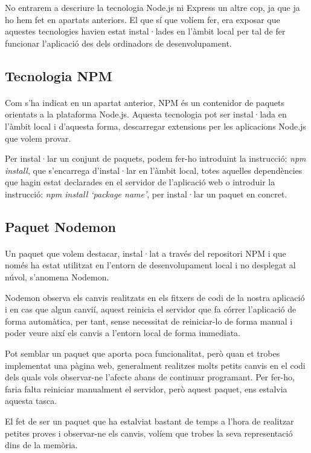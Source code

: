     No entrarem a descriure la tecnologia Node.js ni Express un altre cop, ja que ja ho hem fet en apartats anteriors. El que sí que volíem fer, era exposar que aquestes tecnologies havien estat instal·lades en l’àmbit local per tal de fer funcionar l'aplicació des dels ordinadors de desenvolupament.


    \subsection{Tecnologia NPM}

    \paragraph{}
    Com s'ha indicat en un apartat anterior, NPM és un contenidor de paquets orientats a la plataforma Node.js. Aquesta tecnologia pot ser instal·lada en l'àmbit local i d'aquesta forma, descarregar extensions per les aplicacions Node.js que volem provar.

    Per instal·lar un conjunt de paquets, podem fer-ho introduint la instrucció: \emph{npm install}, que s’encarrega d’instal·lar en l’àmbit local, totes aquelles dependències que hagin estat declarades en el servidor de l’aplicació web o introduir la instrucció: \emph{npm install `package name’}, per instal·lar un paquet en concret.


    \subsection{Paquet Nodemon}

    \paragraph{}
    Un paquet que volem destacar, instal·lat a través del repositori NPM i que només ha estat utilitzat en l’entorn de desenvolupament local i no desplegat al núvol, s’anomena Nodemon.

    Nodemon observa els canvis realitzats en els fitxers de codi de la nostra aplicació i en cas que algun canvií, aquest reinicia el servidor que fa córrer l'aplicació de forma automàtica, per tant, sense necessitat de reiniciar-lo de forma manual i poder veure així els canvis a l'entorn local de forma immediata.

    Pot semblar un paquet que aporta poca funcionalitat, però quan et trobes implementat una pàgina web, generalment realitzes molts petits canvis en el codi dels quals vols observar-ne l'afecte abans de continuar programant. Per fer-ho, faria falta reiniciar manualment el servidor, però aquest paquet, ens estalvia aquesta tasca.

    El fet de ser un paquet que ha estalviat bastant de temps a l'hora de realitzar petites proves i observar-ne els canvis, volíem que trobes la seva representació dins de la memòria.
